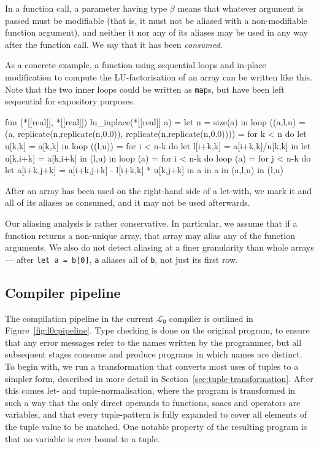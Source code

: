 \documentclass{sigplanconf}  %
\newcommand{\LO}{$\mathcal{L}_0$}
\begin{document}
In a function call, a parameter having type {\tt *$\beta$} means that
whatever argument is passed must be modifiable (that is, it must not
be aliased with a non-modifiable function argument), and neither it
nor any of its aliases may be used in any way after the function call.
We say that it has been {\em consumed}.

As a concrete example, a function using sequential loops and in-place
modification to compute the LU-factorisation of an array can be
written like this.  Note that the two inner loops could be written as
{\tt map}s, but have been left sequential for expository purposes.

\begin{colorcode}
fun (*[[real]], *[[real]]) lu_inplace(*[[real]] a) =
  let n = size(a) in
  loop ((a,l,u) = (a,
                   replicate(n,replicate(n,0.0)),
                   replicate(n,replicate(n,0.0)))) =
    for k < n do
      let u[k,k] = a[k,k] in
      loop ((l,u)) =
        for i < n-k do
          let l[i+k,k] = a[i+k,k]/u[k,k] in
          let u[k,i+k] = a[k,i+k] in
          (l,u)
        in
      loop (a) =
        for i < n-k do
          loop (a) =
            for j < n-k do
              let a[i+k,j+k] =
                a[i+k,j+k] - l[i+k,k] * u[k,j+k] in
          a
        in a
      in (a,l,u)
    in
  (l,u)
\end{colorcode}

After an array has been used on the right-hand side of a let-with, we
mark it and all of its aliases as consumed, and it may not be used
afterwards.

Our aliasing analysis is rather conservative.  In particular, we
assume that if a function returns a non-unique array, that array may
alias any of the function arguments.  We also do not detect aliasing
at a finer granularity than whole arrays --- after {\tt let a = b[0]},
{\tt a} aliases all of {\tt b}, not just its first row.

\subsection{Compiler pipeline}
\label{sec:compiler-pipeline}

The compilation pipeline in the current \LO{} compiler is outlined in
Figure~\ref{fig:l0cpipeline}.  Type checking is done on the original
program, to ensure that any error messages refer to the names written
by the programmer, but all subsequent stages consume and produce
programs in which names are distinct.  To begin with, we run a
transformation that converts most uses of tuples to a simpler form,
described in more detail in Section~\ref{sec:tuple-transformation}.
After this comes let- and tuple-normalisation, where the program is
transformed in such a way that the only direct operands to functions,
{\sc soac}s and operators are variables, and that every tuple-pattern
is fully expanded to cover all elements of the tuple value to be
matched.  One notable property of the resulting program is that no
variable is ever bound to a tuple.
\end{document}
